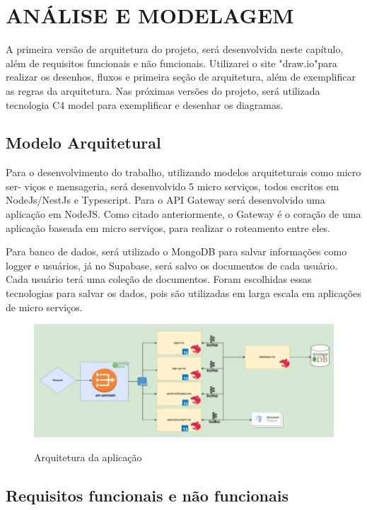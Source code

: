 \chapter{ANÁLISE E MODELAGEM}

A primeira versão de arquitetura do projeto, será desenvolvida neste capítulo, além de
requisitos funcionais e não funcionais. Utilizarei o site "draw.io"para realizar os desenhos, fluxos
e primeira seção de arquitetura, além de exemplificar as regras da arquitetura. Nas próximas
versões do projeto, será utilizada tecnologia C4 model para exemplificar e desenhar os diagramas.

\section{Modelo Arquitetural}
Para o desenvolvimento do trabalho, utilizando modelos arquiteturais como micro ser-
viços e mensageria, será desenvolvido 5 micro serviços, todos escritos em NodeJs/NestJs e
Typescript. Para o API Gateway será desenvolvido uma aplicação em NodeJS. Como citado
anteriormente, o Gateway é o coração de uma aplicação baseada em micro serviços, para realizar
o roteamento entre eles.

Para banco de dados, será utilizado o MongoDB para salvar informações como logger
e usuários, já no Supabase, será salvo os documentos de cada usuário. Cada usuário terá uma
coleção de documentos. Foram escolhidas essas tecnologias para salvar os dados, pois são
utilizadas em larga escala em aplicações de micro serviços.

\begin{figure}[!ht]
    \centering
    \caption{Arquitetura da aplicação}
    \includegraphics[scale=0.44]{assets/application-arch}
    \label{fig:application-arch}
    \tiny
    \sourcemedaddy
\end{figure}


\section{Requisitos funcionais e não funcionais}
